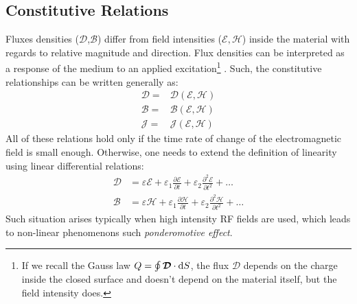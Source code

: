 \subsection{Constitutive Relations}
Fluxes densities ($\mathcal{D}$,$\mathcal{B}$) differ from field intensities ($\mathcal{E},\mathcal{H}$) inside the material  with regards to relative magnitude and direction. Flux densities can be interpreted  as a response of the medium to an applied excitation\footnote{If we recall the Gauss law $	Q = \oint \boldsymbol{\mathcal{D}} \cdot \mathop{}\!\mathrm{d} S$, the flux $\boldsymbol{\mathcal{D}}$ depends on the charge inside the closed surface and doesn't depend on the material itself, but the field intensity does. 	}
. Such, the constitutive relationships can be written generally as:
\begin{subequations}
	\begin{align}
		\boldsymbol{\mathcal{D}} =& \boldsymbol{\mathcal{D}}(\boldsymbol{\mathcal{E}},\boldsymbol{\mathcal{H}}) \\
		\boldsymbol{\mathcal{B}} =& \boldsymbol{\mathcal{B}}(\boldsymbol{\mathcal{E}},\boldsymbol{\mathcal{H}}) \\
		\boldsymbol{\mathcal{J}} =& \boldsymbol{\mathcal{J}}(\boldsymbol{\mathcal{E}},\boldsymbol{\mathcal{H}})
	\end{align}
\end{subequations}
All of these relations hold only if the time rate of change of the electromagnetic field is small enough. Otherwise, one needs to extend the definition of linearity using linear differential relations\parencite{Harrington2001, Jackson1998}:
\begin{subequations}
	\begin{align}
	\boldsymbol{\mathcal{D}} &= \varepsilon \boldsymbol{\mathcal{E}} + \varepsilon_1 \frac{\partial \boldsymbol{\mathcal{E}}}{\partial t} + \varepsilon_2 \frac{\partial^2 \boldsymbol{\mathcal{E}}}{\partial t^2} + \ldots \\
	\boldsymbol{\mathcal{B}} &= \varepsilon \boldsymbol{\mathcal{H}} + \varepsilon_1 \frac{\partial \boldsymbol{\mathcal{H}}}{\partial t} + \varepsilon_2 \frac{\partial^2 \boldsymbol{\mathcal{H}}}{\partial t^2} + \ldots
	\end{align}
\end{subequations}
Such situation arises typically when high intensity RF fields are used, which leads to non-linear phenomenons such \emph{ponderomotive effect}\parencite{Krapchev1979}.



